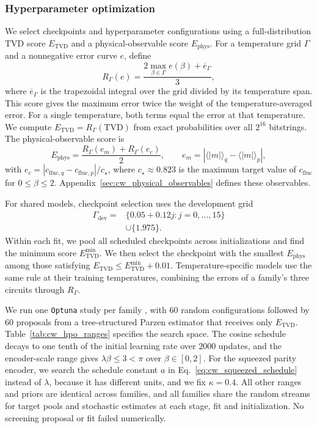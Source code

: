 \documentclass[pra,aps,10pt,twocolumn,floatfix,superscriptaddress, notitlepage,longbibliography]{revtex4-2}
\begin{document}
\subsubsection{Hyperparameter optimization}
\label{sec:cw_hpo}
\label{sec:cw_full_tvd_hpo}

We select checkpoints and hyperparameter configurations using a full-distribution TVD score $E_{\mathrm{TVD}}$ and a physical-observable score $E_{\mathrm{phys}}$. For a temperature grid $\Gamma$ and a nonnegative error curve $e$, define
\begin{equation}
 R_\Gamma(e)=\frac{2\max_{\beta\in \Gamma}e(\beta)+\overline e_\Gamma}{3},
\end{equation}
where $\overline e_\Gamma$ is the trapezoidal integral over the grid divided by its temperature span. This score gives the maximum error twice the weight of the temperature-averaged error. For a single temperature, both terms equal the error at that temperature. We compute $E_{\mathrm{TVD}}=R_\Gamma(\mathrm{TVD})$ from exact probabilities over all $2^{16}$ bitstrings. The physical-observable score is
\begin{equation}
 E_{\mathrm{phys}}=\frac{R_\Gamma(e_m)+R_\Gamma(e_c)}{2},\qquad
 e_m=\left|\langle|m|\rangle_q-\langle|m|\rangle_p\right|,
\end{equation}
with $e_c=|c_{\mathrm{fluc},q}-c_{\mathrm{fluc},p}|/c_\star$, where $c_\star\approx0.823$ is the maximum target value of $c_{\mathrm{fluc}}$ for $0\leq\beta\leq2$. Appendix~\ref{sec:cw_physical_observables} defines these observables.

For shared models, checkpoint selection uses the development grid
\begin{align}
 \Gamma_{\mathrm{dev}}={}&\{0.05+0.12j:j=0,\ldots,15\}\nonumber\\
 &\cup\{1.975\}.
\end{align}
Within each fit, we pool all scheduled checkpoints across initializations and find the minimum score $E_{\mathrm{TVD}}^{\min}$. We then select the checkpoint with the smallest $E_{\mathrm{phys}}$ among those satisfying $E_{\mathrm{TVD}}\leq E_{\mathrm{TVD}}^{\min}+0.01$. Temperature-specific models use the same rule at their training temperatures, combining the errors of a family's three circuits through $R_\Gamma$.

We run one \texttt{Optuna} study per family \cite{akibaOptuna2019}, with $60$ random configurations followed by $60$ proposals from a tree-structured Parzen estimator that receives only $E_{\mathrm{TVD}}$. Table~\ref{tab:cw_hpo_ranges} specifies the search space. The cosine schedule decays to one tenth of the initial learning rate over $2000$ updates, and the encoder-scale range gives $\lambda\beta\leq3<\pi$ over $\beta\in[0,2]$. For the squeezed parity encoder, we search the schedule constant $a$ in Eq.~\eqref{eq:cw_squeezed_schedule} instead of $\lambda$, because it has different units, and we fix $\kappa=0.4$. All other ranges and priors are identical across families, and all families share the random streams for target pools and stochastic estimates at each stage, fit and initialization. No screening proposal or fit failed numerically.
\end{document}
